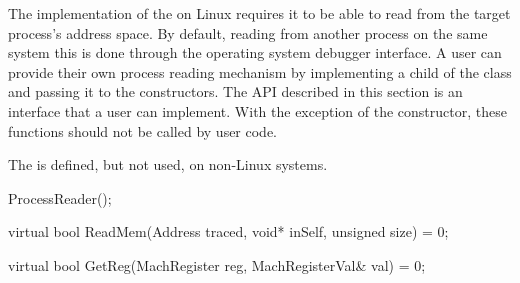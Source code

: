 
The implementation of the  on Linux requires it to be able to read from the target process's address space. By default, reading from another process on the same system this is done through the operating system debugger interface. A user can provide their own process reading mechanism by implementing a child of the  class and passing it to the  constructors.
The API described in this section is an interface that a user can implement. With the exception of the  constructor, these functions should not be called by user code.

The  is defined, but not used, on non-Linux systems.

\begin{apient}
ProcessReader();
\end{apient}

\begin{apient}
virtual bool ReadMem(Address traced,
                     void* inSelf,
                     unsigned size) = 0;
\end{apient}

\begin{apient}
virtual bool GetReg(MachRegister reg,
                    MachRegisterVal& val) = 0;
\end{apient}

